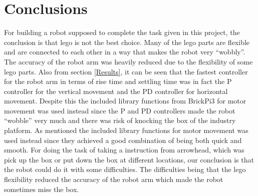 \section{Conclusions}
\label{sec:simon18}
For building a robot supposed to complete the task given in this project, the conclusion is that lego is not the best choice. Many of the lego parts are flexible and are connected to each other in a way that makes the robot very ``wobbly''. The accuracy of the robot arm was heavily reduced due to the flexibility of some lego parts. Also from section \ref{Results}, it can be seen that the fastest controller for the robot arm in terms of rise time and settling time was in fact the P controller for the vertical movement and the PD controller for horizontal movement. Despite this the included library functions from BrickPi3 for motor movement was used instead since the P and PD controllers made the robot ``wobble'' very much and there was risk of knocking the box of the industry platform. As mentioned the included library functions for motor movement was used instead since they achieved a good combination of being both quick and smooth.
For doing the task of taking a instruction from arrowhead, which was pick up the box or put down the box at different locations, our conclusion is that the robot could do it with some difficulties. The difficulties being that the lego flexibility reduced the accuracy of the robot arm which made the robot sometimes miss the box.
